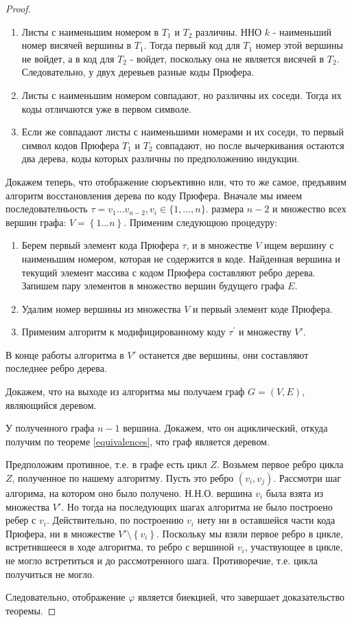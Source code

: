 \begin{proof}
	\begin{enumerate}
		\item Листы с наименьшим номером в $T_{1}$ и $T_{2}$ различны.
		ННО $k$ - наименьший номер висячей вершины  в $T_1$. Тогда первый код для $T_1$ номер этой вершины не войдет, а в код для $T_2$ - войдет, поскольку она не является висячей в $T_2$. Следовательно, у двух деревьев разные коды Прюфера.
		\item Листы с наименьшим номером совпадают, но различны их соседи. Тогда их коды отличаются уже в первом символе.
		\item Если же совпадают листы с наименьшими номерами и их соседи, то первый символ кодов Прюфера $T_1$ и $T_2$ совпадают, но после вычеркивания остаются два дерева, коды которых различны по предположению
		индукции.
	\end{enumerate}
	
	Докажем теперь, что отображение сюръективно или, что то же самое, предъявим алгоритм восстановления дерева по коду Прюфера.
	Вначале мы имеем последователньость $ \tau = v_{1} \ldots v_{n-2}, v_{i} \in\{1, \ldots, n\}$. размера $n-2$ и множество всех вершин графа: $ V = \left\lbrace 1… n\right\rbrace $. Применим следующюю процедуру:
	
	\begin{enumerate} 
		\item Берем первый элемент кода Прюфера $\tau$, и в множестве $V$ ищем вершину с наименьшим номером, которая не содержится в коде. Найденная вершина и текущий элемент массива с кодом Прюфера составляют ребро дерева. Запишем пару элементов в множество вершин будущего графа $E$.
		\item Удалим номер вершины из множества $V$ и первый элемент коде Прюфера.
		\item Применим алгоритм к модифицированному коду $\tau^{\prime}$ и множеству $V'$.
	\end{enumerate}
	
	В конце работы алгоритма в $V'$ останется две вершины, они составляют последнее ребро дерева.
	
	Докажем, что на выходе из алгоритма мы получаем граф $G = (V, E)$, являющийся деревом.
	
	У полученного графа $n-1$ вершина. Докажем, что он ациклический, откуда получим по теореме \ref{equivalences}, что граф является деревом.
	
	Предположим противное, т.\:е. в графе есть цикл $Z$. Возьмем первое ребро цикла $Z$, полученное по нашему алгоритму. Пусть это ребро $\left(v_i, v_j \right)$. Рассмотри шаг алгорима, на котором оно было получено.
	Н.Н.О. вершина $v_i$ была взята из множества $V'$. Но тогда на последующих шагах алгоритма не было построено ребер с $v_i$. Действительно, по построению $v_i$ нету ни в оставшейся части кода Прюфера, ни в множестве $V'\setminus{\left\lbrace v_i\right\rbrace }$. Поскольку мы взяли первое ребро в цикле, встретившееся в ходе алгоритма, то ребро с вершиной $v_i$, участвующее в цикле, не могло встретиться и до рассмотренного шага. Противоречие, т.\:е. цикла получиться не могло.
	
	Следовательно, отображение $\varphi$ является биекцией, что завершает доказательство теоремы.
\end{proof}

